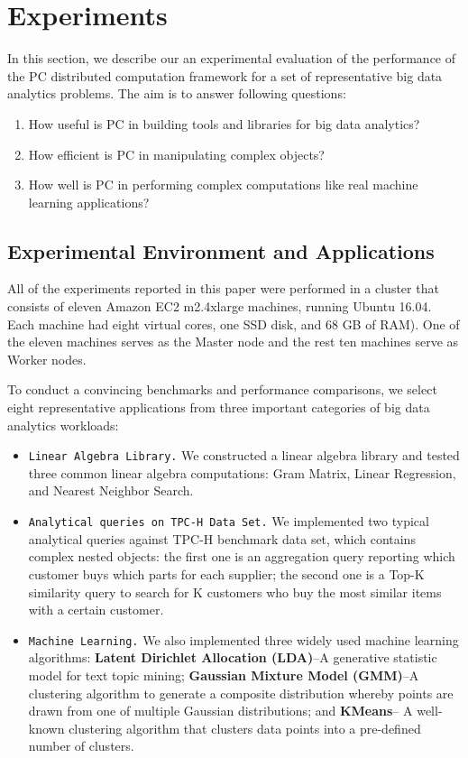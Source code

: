 
\section{Experiments}

In this section, we describe our an experimental evaluation of the
performance of the PC distributed computation framework for a set of
representative big data analytics problems. The aim is to answer
following questions:

\begin {enumerate}
\item How useful is PC in building tools and libraries for big data analytics?
\item How efficient is PC in manipulating complex objects?
\item How well is PC in performing complex computations like real
  machine learning applications?
\end {enumerate}

\subsection {Experimental Environment and Applications}

All of the experiments reported in this paper were performed in a
cluster that consists of eleven Amazon EC2 m2.4xlarge machines,
running Ubuntu 16.04. Each machine had eight virtual cores, one SSD
disk, and 68 GB of RAM). One of the eleven machines serves as the Master
node and the rest ten machines serve as Worker nodes.

\vspace{5pt}
To conduct a convincing benchmarks and performance comparisons, we
select eight representative applications from three important categories
of big data analytics workloads:

\begin {itemize}
\item \texttt{Linear Algebra Library.} We constructed a linear algebra library
  and tested three common linear algebra computations: Gram Matrix,
  Linear Regression, and Nearest Neighbor Search.
\item \texttt{Analytical queries on TPC-H Data
    Set.}  We implemented two typical analytical queries against TPC-H
  benchmark data set, which contains complex nested objects: the first one is an aggregation query reporting which customer buys which
  parts for each supplier; the second one is a Top-K similarity query
  to search for K customers who buy the most similar items with a
  certain customer.
\item \texttt{Machine Learning.} We also implemented three widely used
  machine learning algorithms: \textbf{Latent Dirichlet Allocation (LDA)}--A
  generative statistic model for text topic mining;
  \textbf{Gaussian Mixture Model (GMM)}--A clustering algorithm to generate a composite
  distribution whereby points are drawn from one of multiple Gaussian distributions;  and \textbf{KMeans}-- A well-known clustering algorithm that clusters
  data points into a pre-defined number of clusters.
\end {itemize}


